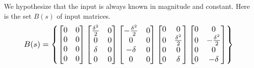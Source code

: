 \documentclass[twocolumn]{article}
\begin{document}
We hypothesize that the input is always known in magnitude and constant. Here is the set $B(s)$ of input matrices.
    \begin{equation*}%
        \resizebox{.9 \columnwidth}{!}{
        $B(s)=\begin{Bmatrix}
            \begin{bmatrix}
                0 & 0 \\
                0          & 0 \\
                0     & 0 \\
                0          & 0 \\
            \end{bmatrix}
            \begin{bmatrix}
                \frac{\delta^{2}}{2} & 0 \\
                0          & 0 \\
                \delta     & 0 \\
                0          & 0 \\
            \end{bmatrix}
            \begin{bmatrix}
                -\frac{\delta^{2}}{2} & 0 \\
                0          & 0 \\
                -\delta     & 0 \\
                0          & 0 \\
            \end{bmatrix}
            \begin{bmatrix}
                0 & 0          \\
                0 & \frac{\delta^{2}}{2} \\
                0 & 0          \\
                0 & \delta     \\
            \end{bmatrix}
            \begin{bmatrix}
                0 & 0          \\
                0 & -\frac{\delta^{2}}{2} \\
                0 & 0          \\
                0 & -\delta     \\
            \end{bmatrix}
        \end{Bmatrix} $ 
        }
    \end{equation*}
\end{document}
